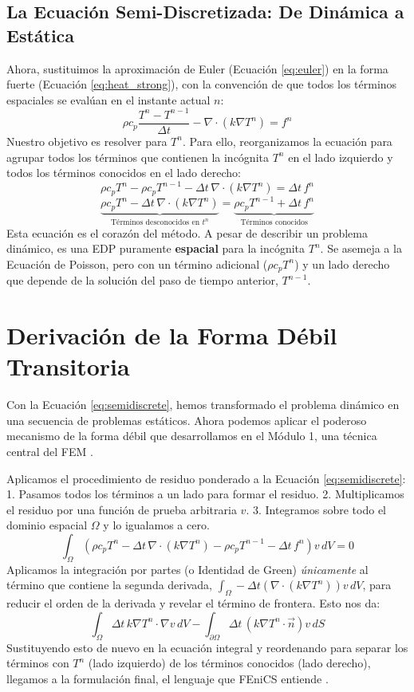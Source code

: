 \documentclass[11pt, a4paper]{article}
\begin{document}
\subsection{La Ecuación Semi-Discretizada: De Dinámica a Estática}
Ahora, sustituimos la aproximación de Euler (Ecuación \ref{eq:euler}) en la forma fuerte (Ecuación \ref{eq:heat_strong}), con la convención de que todos los términos espaciales se evalúan en el instante actual $n$:
$$ \rho c_p \frac{T^n - T^{n-1}}{\Delta t} - \nabla \cdot (k \nabla T^n) = f^n $$
Nuestro objetivo es resolver para $T^n$. Para ello, reorganizamos la ecuación para agrupar todos los términos que contienen la incógnita $T^n$ en el lado izquierdo y todos los términos conocidos en el lado derecho:
$$ \rho c_p T^n - \rho c_p T^{n-1} - \Delta t \, \nabla \cdot (k \nabla T^n) = \Delta t \, f^n $$
\begin{equation}
    \underbrace{\rho c_p T^n - \Delta t \, \nabla \cdot (k \nabla T^n)}_{\text{Términos desconocidos en } t^n} = \underbrace{\rho c_p T^{n-1} + \Delta t \, f^n}_{\text{Términos conocidos}}
    \label{eq:semidiscrete}
\end{equation}
Esta ecuación es el corazón del método. A pesar de describir un problema dinámico, es una EDP puramente \textbf{espacial} para la incógnita $T^n$. Se asemeja a la Ecuación de Poisson, pero con un término adicional ($\rho c_p T^n$) y un lado derecho que depende de la solución del paso de tiempo anterior, $T^{n-1}$.

\section{Derivación de la Forma Débil Transitoria}
Con la Ecuación \ref{eq:semidiscrete}, hemos transformado el problema dinámico en una secuencia de problemas estáticos. Ahora podemos aplicar el poderoso mecanismo de la forma débil que desarrollamos en el Módulo 1, una técnica central del FEM \cite{zienkiewicz2013}.

Aplicamos el procedimiento de residuo ponderado a la Ecuación \ref{eq:semidiscrete}:
1.  Pasamos todos los términos a un lado para formar el residuo.
2.  Multiplicamos el residuo por una función de prueba arbitraria $v$.
3.  Integramos sobre todo el dominio espacial $\Omega$ y lo igualamos a cero.
$$ \int_{\Omega} \left( \rho c_p T^n - \Delta t \, \nabla \cdot (k \nabla T^n) - \rho c_p T^{n-1} - \Delta t \, f^n \right) v \, dV = 0 $$
Aplicamos la integración por partes (o Identidad de Green) \textit{únicamente} al término que contiene la segunda derivada, $\int_{\Omega} - \Delta t (\nabla \cdot (k \nabla T^n)) v \, dV$, para reducir el orden de la derivada y revelar el término de frontera. Esto nos da:
$$ \int_{\Omega} \Delta t \, k \nabla T^n \cdot \nabla v \, dV - \int_{\partial \Omega} \Delta t \, (k \nabla T^n \cdot \vec{n}) v \, dS $$
Sustituyendo esto de nuevo en la ecuación integral y reordenando para separar los términos con $T^n$ (lado izquierdo) de los términos conocidos (lado derecho), llegamos a la formulación final, el lenguaje que FEniCS entiende \cite{logg2012}.
\end{document}
